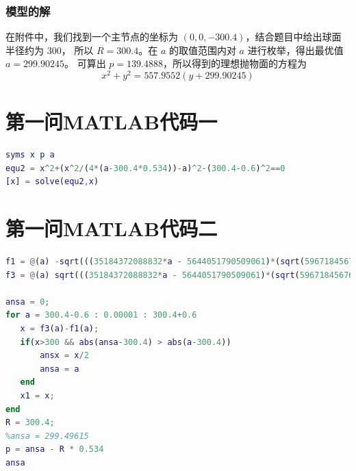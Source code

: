 \documentclass[withoutpreface,bwprint]{cumcmthesis} %
\begin{document}
\subsubsection{模型的解}
在附件中，我们找到一个主节点的坐标为 $(0,0,-300.4)$，结合题目中给出球面半径约为 $300$，
所以 $R = 300.4$。在 $a$ 的取值范围内对 $a$ 进行枚举，得出最优值 $a = 299.90245$。
可算出 $p = 139.4888$，所以得到的理想抛物面的方程为
\[
    x^2 + y^2 = 557.9552(y + 299.90245)
\]
\nocite{宋叶志2019}

\begin{appendices}
\section{第一问MATLAB代码一}
\begin{lstlisting}[language=matlab]
syms x p a
equ2 = x^2+(x^2/(4*(a-300.4*0.534))-a)^2-(300.4-0.6)^2==0
[x] = solve(equ2,x)
\end{lstlisting}
\section{第一问MATLAB代码二}
\begin{lstlisting}[language=matlab]
f1 = @(a) -sqrt(((35184372088832*a - 5644051790509061)*(sqrt(59671845676091418542400129992729 - 198582418285909280249192906752*a) - 17592186044416*a + 5644051790509061))/154742504910672534362390528);
f3 = @(a) sqrt(((35184372088832*a - 5644051790509061)*(sqrt(59671845676091418542400129992729 - 198582418285909280249192906752*a) - 17592186044416*a + 5644051790509061))/154742504910672534362390528);

ansa = 0;
for a = 300.4-0.6 : 0.00001 : 300.4+0.6
   x = f3(a)-f1(a);
   if(x>300 && abs(ansa-300.4) > abs(a-300.4))
       ansx = x/2
       ansa = a
   end
   x1 = x;
end
R = 300.4;
%ansa = 299.49615
p = ansa - R * 0.534
ansa
\end{lstlisting}
\end{appendices}
\end{document}
